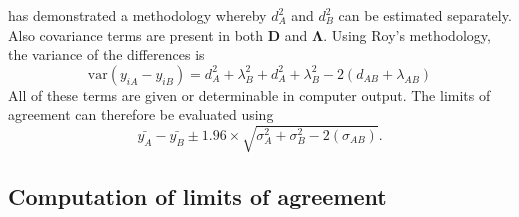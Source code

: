 \documentclass[12pt, a4paper]{report}
\theoremstyle{plain}
\theoremstyle{definition}
\theoremstyle{remark}
\begin{document}
	\citet{ARoy2009} has demonstrated a methodology whereby $d^2_{A}$ and $d^2_{B}$ can be estimated separately. Also covariance terms are present in both $\boldsymbol{D}$ and $\boldsymbol{\Lambda}$. Using Roy's methodology, the variance of the differences is
	\begin{equation}
	\mbox{var} (y_{iA}-y_{iB})= d^2_{A} + \lambda^2_{B} + d^2_{A} + \lambda^2_{B} - 2(d_{AB} + \lambda_{AB})
	\end{equation}
	All of these terms are given or determinable in computer output.
	The limits of agreement can therefore be evaluated using
	\begin{equation}
	\bar{y_{A}}-\bar{y_{B}} \pm 1.96 \times \sqrt{ \sigma^2_{A} + \sigma^2_{B}  - 2(\sigma_{AB})}.
	\end{equation}
	
%	

	
	
	\subsection{Computation of limits of agreement }
	
	
	
\end{document}
